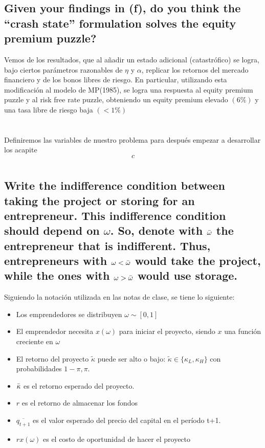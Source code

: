 \documentclass[12pt]{article}
\begin{document}
\subsection{Given your findings in (f), do you think the “crash state” formulation solves the equity premium puzzle?}

Vemos de los resultados, que al añadir un estado adicional (catastrófico) se logra, bajo ciertos parámetros razonables de $\eta$ y $\alpha$, replicar los retornos del mercado financiero y de los bonos libres de riesgo. En particular, utilizando esta modificación al modelo de MP(1985), se logra una respuesta al equity premium puzzle y al risk free rate puzzle, obteniendo un equity premium elevado $(6\%)$ y una tasa libre de riesgo baja $(<1\%)$

\section{}
Definiremos las variables de nuestro problema para después empezar a desarrollar los acapite
\begin{equation}
    c
\end{equation}

\subsection{}

\section{}
\subsection{ Write the indifference condition between taking the project or storing for
an entrepreneur. This indifference condition should depend on $\omega$. So,
denote with $\Bar{\omega}$ the entrepreneur that is indifferent. Thus, entrepreneurs
with $\omega < \Bar{\omega}$ would take the project, while the ones with $\omega > \Bar{\omega}$ would use
storage.}


Siguiendo la notación utilizada en las notas de clase, se tiene lo siguiente:

\begin{itemize}
    \item Los emprendedores se distribuyen $\omega \sim [0,1]$
    \item El emprendedor necesita $x(\omega)$ para iniciar el proyecto, siendo $x$ una función creciente en $\omega$
    \item El retorno del proyecto $\widetilde{\kappa}$ puede ser alto o bajo: $\widetilde{\kappa} \in \{\kappa_L, \kappa_ H\}$ con probabilidades $1-\pi, \pi$. 
    \item $\Bar{\kappa}$ es el retorno esperado del proyecto.
    \item $r$ es el retorno de almacenar los fondos
    \item $\overline{q_{t+1}}$ es el valor esperado del precio del capital en el período t+1.
    \item $rx(\omega)$ es el costo de oportunidad de hacer el proyecto
\end{itemize}
\end{document}
